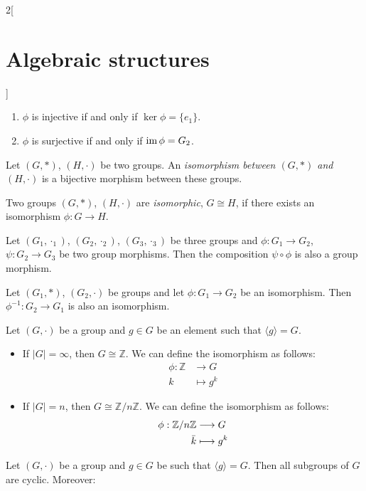 \documentclass[class=article,10pt,crop=false]{standalone}
\begin{document}
\begin{multicols}{2}[\section{Algebraic structures}]
\begin{prop}
\begin{enumerate}
    \item $\phi$ is injective if and only if $\ker\phi=\{e_1\}$.
    \item $\phi$ is surjective if and only if $\operatorname{im}\phi=G_2$.
\end{enumerate}
\end{prop}
\begin{definition}
Let $(G,*)$, $(H,\cdot)$ be two groups. An \textit{isomorphism between $(G,*)$ and $(H,\cdot)$} is a bijective morphism between these groups.
\end{definition}
\begin{definition}
Two groups $(G,*)$, $(H,\cdot)$ are \textit{isomorphic}, $G\cong H$, if there exists an isomorphism $\phi:G\rightarrow H$.
\end{definition}
\begin{prop}
Let $(G_1,\cdot_1)$, $(G_2,\cdot_2)$, $(G_3,\cdot_3)$ be three groups and $\phi:G_1\rightarrow G_2$, $\psi:G_2\rightarrow G_3$ be two group morphisms. Then the composition $\psi\circ\phi$ is also a group morphism.
\end{prop}
\begin{prop}
Let $(G_1,*)$, $(G_2,\cdot)$ be groups and let $\phi: G_1\rightarrow G_2$ be an isomorphism. Then $\phi^{-1}: G_2\rightarrow G_1$ is also an isomorphism.
\end{prop}
\begin{theorem}
Let $(G,\cdot)$ be a group and $g\in G$ be an element such that $\langle g\rangle=G$.
\begin{itemize}
    \item If $|G|=\infty$, then $G\cong\mathbb{Z}$. We can define the isomorphism as follows: 
    \begin{align*}
        \phi:\mathbb{Z}&\longrightarrow G\\
        k&\longmapsto g^k
    \end{align*}
    \item If $|G|=n$, then $G\cong\mathbb{Z}/n\mathbb{Z}$. We can define the isomorphism as follows: 
    \begin{align*}
        \phi:\mathbb{Z}/n\mathbb{Z}&\longrightarrow G\\
        \Bar{k}&\longmapsto g^k
    \end{align*}
\end{itemize}
\end{theorem}
\begin{corollary}
Let $(G,\cdot)$ be a group and $g\in G$ be such that $\langle g\rangle=G$. Then all subgroups of $G$ are cyclic. Moreover:

\end{corollary}
\end{multicols}
\end{document}
